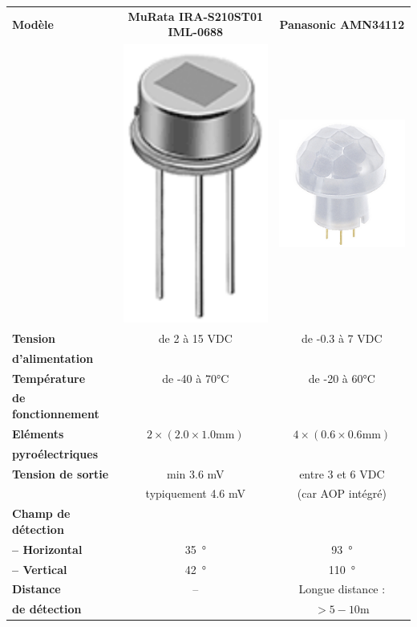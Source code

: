 \documentclass{article}
\begin{document}
            \begin{table}[H]
            \centering
            \begin{tabular}{l|c|c}
                \textbf{Modèle} & \textbf{MuRata IRA-S210ST01 IML-0688} & \textbf{Panasonic AMN34112}\\
                & \includegraphics[width=0.1\linewidth]{./images/pyro-murata.png} & \includegraphics[width=0.2\linewidth]{./images/pyro-panasonic.png}\\
                \hline
                \textbf{Tension}            & de 2 à 15 VDC                                 & de -0.3 à 7 VDC\\
                \textbf{d'alimentation}     &                                               & \\
                \hline
                \textbf{Température}        & de -40 à 70\si{\celsius}                      & de -20 à 60\si{\celsius}\\
                \textbf{de fonctionnement}  & & \\
                \hline
                \textbf{Eléments}           & $2 \times (2.0 \times 1.0 \si{\milli\meter})$ & $4 \times (0.6 \times 0.6 \si{\milli\meter})$\\
                \textbf{pyroélectriques}    &                                               & \\
                \hline
                \textbf{Tension de sortie}  & min 3.6 mV                                    & entre 3 et 6 VDC \\
                \textbf{}                   & typiquement 4.6 mV                            & (car AOP intégré)\\
                \hline
                \textbf{Champ de détection} & & \\
                \textbf{-- Horizontal}      & \SI{35}{\degree} & \SI{93}{\degree}\\
                \textbf{-- Vertical}        & \SI{42}{\degree} & \SI{110}{\degree}\\
                \hline
                \textbf{Distance}           & --                                            & Longue distance :\\
                \textbf{de détection}       &                                               & $> 5 - 10 \si{\meter}$ \\
            \end{tabular}
            \end{table}
\end{document}
